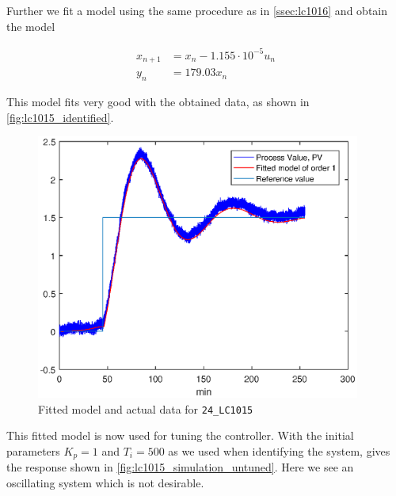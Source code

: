 Further we fit a model using the same procedure as in \autoref{ssec:lc1016} and obtain the model 

\begin{equation}
	\begin{aligned}
		x_{n+1} &= x_n - 1.155\cdot 10^{-5} u_n \\
		y_n &= 179.03 x_n
	\end{aligned}
\end{equation}

This model fits very good with the obtained data, as shown in \autoref{fig:lc1015_identified}.

\begin{figure}[ht!]
	\centering
	\includegraphics[width=0.95\textwidth]{fig/identification/lc1015_order1.eps}
	\caption{Fitted model and actual data for \texttt{24\_LC1015}}
	\label{fig:lc1015_identified}
\end{figure}

This fitted model is now used for tuning the controller. With the initial parameters $K_p = 1$ and $T_i = 500$ as we used when identifying the system, gives the response shown in \autoref{fig:lc1015_simulation_untuned}. Here we see an oscillating system which is not desirable.

